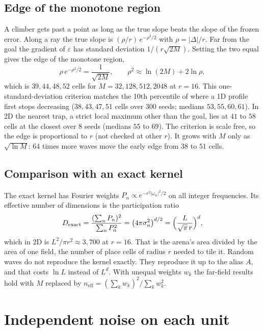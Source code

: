 \documentclass[11pt]{article}
\begin{document}
\subsection{Edge of the monotone region}

A climber gets past a point as long as the true slope beats the slope of the frozen error.
Along a ray the true slope is $(\rho/r)\,e^{-\rho^2/2}$ with $\rho = |\Delta|/r$. Far from the goal
the gradient of $\varepsilon$ has standard deviation $1/(r\sqrt{2M})$. Setting the two equal gives
the edge of the monotone region,
\begin{equation}
  \rho\,e^{-\rho^2/2} = \frac{1}{\sqrt{2M}}, \qquad \rho^2 \approx \ln(2M) + 2\ln\rho ,
\end{equation}
which is $39, 44, 48, 52$ cells for $M = 32, 128, 512, 2048$ at $r = 16$. This one-standard-deviation
criterion matches the 10th percentile of where a 1D profile first stops decreasing ($38, 43, 47, 51$
cells over 300 seeds; medians $53, 55, 60, 61$). In 2D the nearest trap, a strict local maximum
other than the goal, lies at $41$ to $58$ cells at the closest over 8 seeds (medians $55$ to $69$).
The criterion is scale free, so the edge is proportional to $r$ (not checked at other $r$). It grows
with $M$ only as $\sqrt{\ln M}$: 64 times more waves move the early edge from $38$ to $51$ cells.

\subsection{Comparison with an exact kernel}

The exact kernel has Fourier weights $P_n \propto e^{-r^2|\omega_n|^2/2}$ on all integer
frequencies. Its effective number of dimensions is the participation ratio
\begin{equation}
  D_{\text{exact}} = \frac{(\sum_n P_n)^2}{\sum_n P_n^2}
  = \bigl(4\pi\sigma_n^2\bigr)^{d/2} = \Bigl(\frac{L}{\sqrt{\pi}\,r}\Bigr)^{d},
\end{equation}
which in 2D is $L^2/\pi r^2 \approx 3{,}700$ at $r = 16$. That is the arena's area divided by the
area of one field, the number of place cells of radius $r$ needed to tile it. Random waves do not
reproduce the kernel exactly. They reproduce it up to the alias $A$, and that costs $\ln L$
instead of $L^d$. With unequal weights $w_k$ the far-field results hold with $M$ replaced by
$n_{\text{eff}} = (\sum_k w_k)^2/\sum_k w_k^2$.

\section{Independent noise on each unit}
\end{document}
